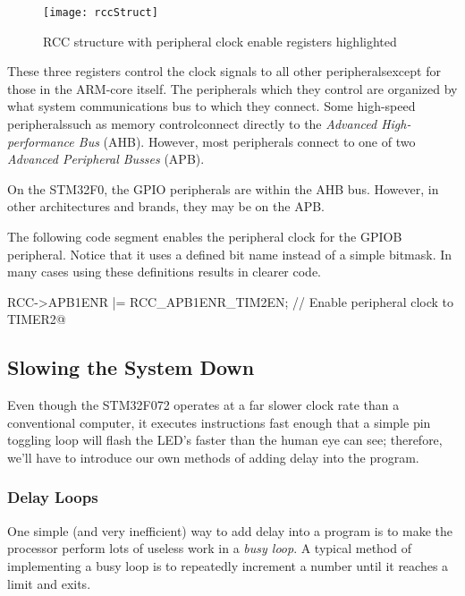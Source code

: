 \documentclass[11pt,fleqn]{book} %
\makeatletter
\newcommand{\ilcode}[1]{
    \begin{center} \parskip=-15pt \colorbox{gray!20!white}{
        \parbox{\columnwidth-2\fboxsep}{
            \lstinline@#1@
        }
    } \end{center}
}
\makeatother
\begin{document}
\begin{figure}[]
    \centering\texttt{[image: rccStruct]}
    \caption{RCC structure with peripheral clock enable registers highlighted}
    \label{rccStruct}
\end{figure}

These three registers control the clock signals to all other peripherals\textemdash except for those in the ARM-core itself. The peripherals which they control are organized by what system communications bus to which they connect. Some high-speed peripherals\textemdash such as memory control\textemdash connect directly to the \textit{Advanced High-performance Bus} (AHB). However, most peripherals connect to one of two \textit{Advanced Peripheral Busses} (APB).

On the STM32F0, the GPIO peripherals are within the AHB bus. However, in other architectures and brands, they may be on the APB.

\begin{example}
    The following code segment enables the peripheral clock for the GPIOB peripheral. Notice that it uses a defined bit name instead of a simple bitmask. In many cases using these definitions results in clearer code.

    \ilcode{RCC->APB1ENR |= RCC\_APB1ENR\_TIM2EN;    // Enable peripheral clock to TIMER2}
    \smallskip
\end{example}

\subsection{Slowing the System Down}
Even though the STM32F072 operates at a far slower clock rate than a conventional computer, it executes instructions fast enough that a simple pin toggling loop will flash the LED's faster than the human eye can see; therefore, we'll have to introduce our own methods of adding delay into the program.

\subsubsection{Delay Loops}
One simple (and very inefficient) way to add delay into a program is to make the processor perform lots of useless work in a \textit{busy loop}. A typical method of implementing a busy loop is to repeatedly increment a number until it reaches a limit and exits.
\end{document}
